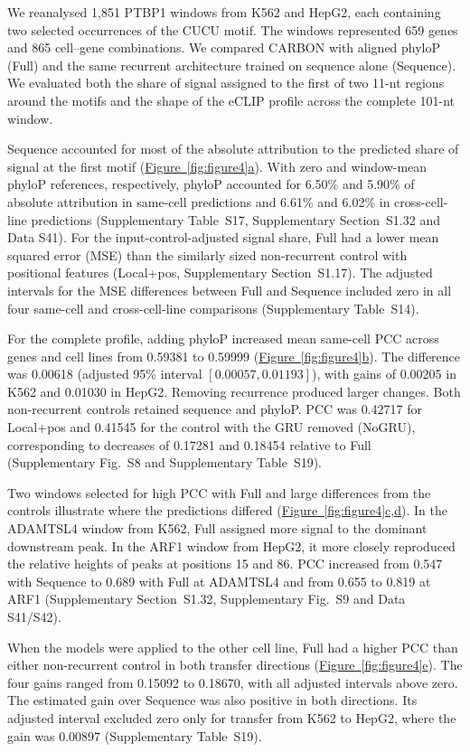 \documentclass[webpdf,contemporary,large]{current_assets/oup-authoring-template}
\newcommand{\figpanelref}[2]{\hyperref[#1]{Figure~\ref*{#1}#2}}
\newcommand{\supfig}[1]{Supplementary Fig.~#1}
\newcommand{\suptab}[1]{Supplementary Table~#1}
\newcommand{\supsect}[1]{Supplementary Section~#1}
\begin{document}
We reanalysed 1,851 PTBP1 windows from K562 and HepG2, each containing two selected occurrences of the CUCU motif. The windows represented 659 genes and 865 cell--gene combinations. We compared CARBON with aligned phyloP (Full) and the same recurrent architecture trained on sequence alone (Sequence). We evaluated both the share of signal assigned to the first of two 11-nt regions around the motifs and the shape of the eCLIP profile across the complete 101-nt window.

Sequence accounted for most of the absolute attribution to the predicted share of signal at the first motif (\figpanelref{fig:figure4}{a}). With zero and window-mean phyloP references, respectively, phyloP accounted for 6.50\% and 5.90\% of absolute attribution in same-cell predictions and 6.61\% and 6.02\% in cross-cell-line predictions (\suptab{S17}, \supsect{S1.32} and Data S41). For the input-control-adjusted signal share, Full had a lower mean squared error (MSE) than the similarly sized non-recurrent control with positional features (Local+pos, \supsect{S1.17}). The adjusted intervals for the MSE differences between Full and Sequence included zero in all four same-cell and cross-cell-line comparisons (\suptab{S14}).

For the complete profile, adding phyloP increased mean same-cell PCC across genes and cell lines from 0.59381 to 0.59999 (\figpanelref{fig:figure4}{b}). The difference was 0.00618 (adjusted 95\% interval $[0.00057,0.01193]$), with gains of 0.00205 in K562 and 0.01030 in HepG2. Removing recurrence produced larger changes. Both non-recurrent controls retained sequence and phyloP. PCC was 0.42717 for Local+pos and 0.41545 for the control with the GRU removed (NoGRU), corresponding to decreases of 0.17281 and 0.18454 relative to Full (\supfig{S8} and \suptab{S19}).

Two windows selected for high PCC with Full and large differences from the controls illustrate where the predictions differed (\figpanelref{fig:figure4}{c,d}). In the ADAMTSL4 window from K562, Full assigned more signal to the dominant downstream peak. In the ARF1 window from HepG2, it more closely reproduced the relative heights of peaks at positions 15 and 86. PCC increased from 0.547 with Sequence to 0.689 with Full at ADAMTSL4 and from 0.655 to 0.819 at ARF1 (\supsect{S1.32}, \supfig{S9} and Data S41/S42).

When the models were applied to the other cell line, Full had a higher PCC than either non-recurrent control in both transfer directions (\figpanelref{fig:figure4}{e}). The four gains ranged from 0.15092 to 0.18670, with all adjusted intervals above zero. The estimated gain over Sequence was also positive in both directions. Its adjusted interval excluded zero only for transfer from K562 to HepG2, where the gain was 0.00897 (\suptab{S19}).
\end{document}
